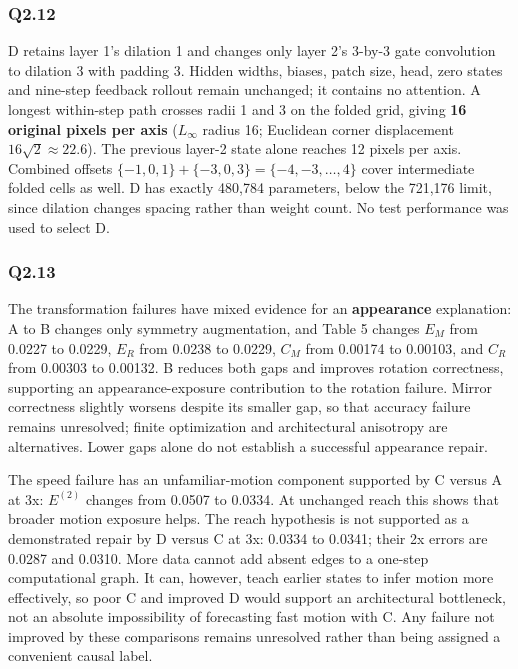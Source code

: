 \documentclass[
  10pt,
  a4paper,
]{article}
\begin{document}
\clearpage

\subsubsection{Q2.12}\label{q2.12}

D retains layer 1's dilation 1 and changes only layer 2's 3-by-3 gate
convolution to dilation 3 with padding 3. Hidden widths, biases, patch
size, head, zero states and nine-step feedback rollout remain unchanged;
it contains no attention. A longest within-step path crosses radii 1 and
3 on the folded grid, giving \textbf{16 original pixels per axis}
(\(L_\infty\) radius 16; Euclidean corner displacement
\(16\sqrt2\approx22.6\)). The previous layer-2 state alone reaches 12
pixels per axis. Combined offsets
\(\{-1,0,1\}+\{-3,0,3\}=\{-4,-3,\ldots,4\}\) cover intermediate folded
cells as well. D has exactly 480,784 parameters, below the 721,176
limit, since dilation changes spacing rather than weight count. No test
performance was used to select D.

\subsubsection{Q2.13}\label{q2.13}

The transformation failures have mixed evidence for an
\textbf{appearance} explanation: A to B changes only symmetry
augmentation, and Table 5 changes \(E_M\) from 0.0227 to 0.0229, \(E_R\)
from 0.0238 to 0.0229, \(C_M\) from 0.00174 to 0.00103, and \(C_R\) from
0.00303 to 0.00132. B reduces both gaps and improves rotation
correctness, supporting an appearance-exposure contribution to the
rotation failure. Mirror correctness slightly worsens despite its
smaller gap, so that accuracy failure remains unresolved; finite
optimization and architectural anisotropy are alternatives. Lower gaps
alone do not establish a successful appearance repair.

The speed failure has an unfamiliar-motion component supported by C
versus A at 3x: \(E^{(2)}\) changes from 0.0507 to 0.0334. At unchanged
reach this shows that broader motion exposure helps. The reach
hypothesis is not supported as a demonstrated repair by D versus C at
3x: 0.0334 to 0.0341; their 2x errors are 0.0287 and 0.0310. More data
cannot add absent edges to a one-step computational graph. It can,
however, teach earlier states to infer motion more effectively, so poor
C and improved D would support an architectural bottleneck, not an
absolute impossibility of forecasting fast motion with C. Any failure
not improved by these comparisons remains unresolved rather than being
assigned a convenient causal label.
\end{document}
